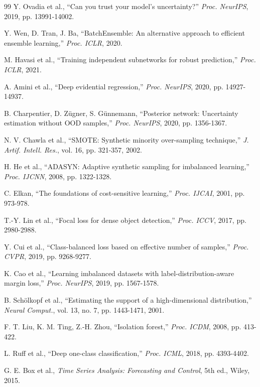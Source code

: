 \documentclass[review,12pt]{elsarticle}
\begin{document}
\begin{thebibliography}{99}
Y. Ovadia et al., ``Can you trust your model's uncertainty?'' \textit{Proc. NeurIPS}, 2019, pp. 13991-14002.

Y. Wen, D. Tran, J. Ba, ``BatchEnsemble: An alternative approach to efficient ensemble learning,'' \textit{Proc. ICLR}, 2020.

M. Havasi et al., ``Training independent subnetworks for robust prediction,'' \textit{Proc. ICLR}, 2021.

A. Amini et al., ``Deep evidential regression,'' \textit{Proc. NeurIPS}, 2020, pp. 14927-14937.

B. Charpentier, D. Zügner, S. Günnemann, ``Posterior network: Uncertainty estimation without OOD samples,'' \textit{Proc. NeurIPS}, 2020, pp. 1356-1367.

N. V. Chawla et al., ``SMOTE: Synthetic minority over-sampling technique,'' \textit{J. Artif. Intell. Res.}, vol. 16, pp. 321-357, 2002.

H. He et al., ``ADASYN: Adaptive synthetic sampling for imbalanced learning,'' \textit{Proc. IJCNN}, 2008, pp. 1322-1328.

C. Elkan, ``The foundations of cost-sensitive learning,'' \textit{Proc. IJCAI}, 2001, pp. 973-978.

T.-Y. Lin et al., ``Focal loss for dense object detection,'' \textit{Proc. ICCV}, 2017, pp. 2980-2988.

Y. Cui et al., ``Class-balanced loss based on effective number of samples,'' \textit{Proc. CVPR}, 2019, pp. 9268-9277.

K. Cao et al., ``Learning imbalanced datasets with label-distribution-aware margin loss,'' \textit{Proc. NeurIPS}, 2019, pp. 1567-1578.

B. Schölkopf et al., ``Estimating the support of a high-dimensional distribution,'' \textit{Neural Comput.}, vol. 13, no. 7, pp. 1443-1471, 2001.

F. T. Liu, K. M. Ting, Z.-H. Zhou, ``Isolation forest,'' \textit{Proc. ICDM}, 2008, pp. 413-422.

L. Ruff et al., ``Deep one-class classification,'' \textit{Proc. ICML}, 2018, pp. 4393-4402.

G. E. Box et al., \textit{Time Series Analysis: Forecasting and Control}, 5th ed., Wiley, 2015.


\end{thebibliography}
\end{document}
